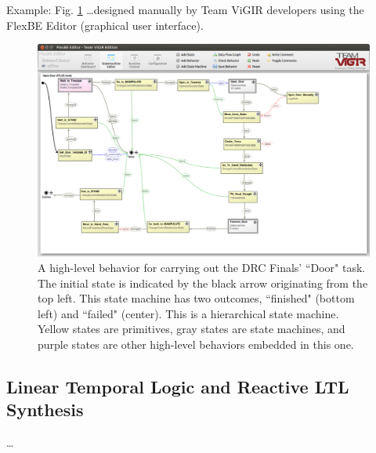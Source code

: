 Example: Fig. \ref{Fig:FlexBESM} \ldots designed manually by Team ViGIR developers using the FlexBE Editor (graphical user interface).

\begin{figure}[t]
\centering
\includegraphics[width=0.99\columnwidth,clip]{./img/behavior_open_door.png}
\caption{A high-level behavior for carrying out the DRC Finals' ``Door" task.
The initial state is indicated by the black arrow originating from the top left.
This state machine has two outcomes, ``finished" (bottom left) and ``failed" (center).
This is a hierarchical state machine. Yellow states are primitives, gray states are state machines, and purple states are other high-level behaviors embedded in this one.
}
\label{Fig:FlexBESM}
\end{figure}

\subsection{Linear Temporal Logic and Reactive LTL Synthesis}

\ldots